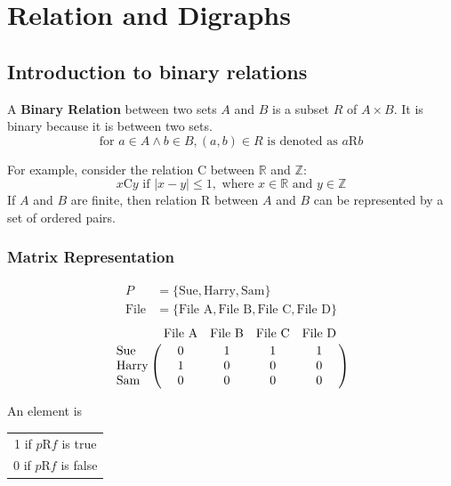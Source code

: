 \section{Relation and Digraphs}
\subsection{Introduction to binary relations}

A \textbf{Binary Relation} between two sets $A$ and $B$ is a subset $R$ of $A \times B$.
It is binary because it is between two sets.
\[
  \text{for } a \in A \land b \in B, (a,b) \in R \text{ is denoted as } a\text{R}b
\]

For example, consider the relation C between $\mathbb{R}$ and $\mathbb{Z}$:
\[
  x\text{C}y \text{ if } \left\lvert x-y\right\rvert \leq 1, \text{ where } x \in \mathbb{R} \text{ and } y \in \mathbb{Z}
\]
If $A$ and $B$ are finite, then relation R between $A$ and $B$ can be represented by a set of ordered pairs.

\subsubsection*{Matrix Representation}
\begin{align*}
  P           & = \{\text{Sue}, \text{Harry}, \text{Sam}\}                       \\
  \text{File} & = \{\text{File A}, \text{File B}, \text{File C}, \text{File D}\}
\end{align*}
\[
  \bordermatrix{ & \text{File A} & \text{File B} & \text{File C} & \text{File D} \cr
    \text{Sue}   & 0 & 1 & 1 & 1 \cr
    \text{Harry} & 1 & 0 & 0 & 0 \cr
    \text{Sam}   & 0 & 0 & 0 & 0 \cr }
\]
\begin{center}
  An element is
  \begin{tabular}{c}
    1 if $p$R$f$ is true \\
    0 if $p$R$f$ is false
  \end{tabular}
\end{center}

